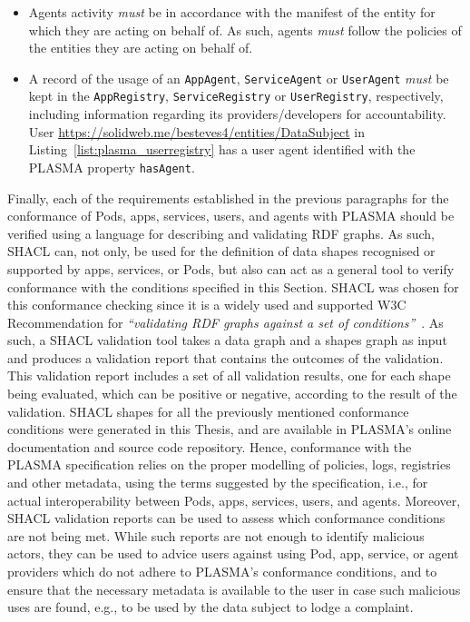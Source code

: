 \begin{itemize}
    \item Agents activity \textit{must} be in accordance with the manifest of the entity for which they are acting on behalf of. As such, agents \textit{must} follow the policies of the entities they are acting on behalf of.
    \item A record of the usage of an \texttt{AppAgent}, \texttt{ServiceAgent} or \texttt{UserAgent} \textit{must} be kept in the \texttt{AppRegistry}, \texttt{ServiceRegistry} or \texttt{UserRegistry}, respectively, including information regarding its providers/developers for accountability. User \url{https://solidweb.me/besteves4/entities/DataSubject} in Listing~\ref{list:plasma_userregistry} has a user agent identified with the PLASMA property \texttt{hasAgent}.
\end{itemize}

Finally, each of the requirements established in the previous paragraphs for the conformance of Pods, apps, services, users, and agents with PLASMA should be verified using a language for describing and validating RDF graphs.
As such, SHACL can, not only, be used for the definition of data shapes recognised or supported by apps, services, or Pods, but also can act as a general tool to verify conformance with the conditions specified in this Section.
SHACL was chosen for this conformance checking since it is a widely used and supported W3C Recommendation for \textit{``validating RDF graphs against a set of conditions''}~\citep{knublauch_shapes_2017}.
As such, a SHACL validation tool takes a data graph and a shapes graph as input and produces a validation report that contains the outcomes of the validation.
This validation report includes a set of all validation results, one for each shape being evaluated, which can be positive or negative, according to the result of the validation. 
SHACL shapes for all the previously mentioned conformance conditions were generated in this Thesis, and are available in PLASMA's online documentation and source code repository.
Hence, conformance with the PLASMA specification relies on the proper modelling of policies, logs, registries and other metadata, using the terms suggested by the specification, i.e., for actual interoperability between Pods, apps, services, users, and agents.
Moreover, SHACL validation reports can be used to assess which conformance conditions are not being met.
While such reports are not enough to identify malicious actors, they can be used to advice users against using Pod, app, service, or agent providers which do not adhere to PLASMA's conformance conditions, and to ensure that the necessary metadata is available to the user in case such malicious uses are found, e.g., to be used by the data subject to lodge a complaint.

